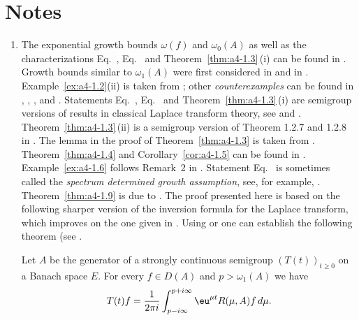 \section*{Notes}
\begin{enumerate}[label=\emph{Section \arabic*:}, wide, itemsep=1ex]

\item 
The exponential growth bounds $\omega(f)$ and $\omega_{0}(A)$ as well as the characterizations Eq.~, Eq.~ and Theorem~\ref{thm:a4-1.3}\,(i) can be found in \textcite{hillephillips:1957}.
Growth bounds similar to $\omega_{1}(A)$ were first considered in \textcite{djacenko:1976} and in \textcite[Proposition~2]{zabczyk:1979}. 
Example~\ref{ex:a4-1.2}(ii) is taken from \textcite{wolff:1981}; other \emph{counterexamples} can be found in \textcite{hillephillips:1957}, \textcite{foias:1973}, \textcite{triggiani:1975a}, 
\textcite{zabczyk:1975} and \textcite{greinervoigtwolff:1981}. 
Statements Eq.~, Eq.~ and Theorem~\ref{thm:a4-1.3}\,(i) are semigroup versions of results in classical Laplace transform theory, see \textcite{hillephillips:1957} and \textcite{widder:1946}. 
Theorem~\ref{thm:a4-1.3}\,(ii) is a semigroup version of Theorem 1.2.7 and 1.2.8 in \textcite{doetsch:1950}. 
The lemma in the proof of Theorem~\ref{thm:a4-1.3} is taken from \textcite{milstein:1975}. 
Theorem~\ref{thm:a4-1.4} and Corollary~\ref{cor:a4-1.5} can be found in \textcite{neubrander:1985a}. 
Example~\ref{ex:a4-1.6} follows Remark~2 in \textcite{zabczyk:1975}. 
Statement Eq.~ is sometimes called the \emph{spectrum determined growth assumption}, see, for example, \textcite{triggiani:1975b}. 
Theorem~\ref{thm:a4-1.9} is due to \textcite{slemrod:1976}. 
The proof presented here is based on the following sharper version of the inversion formula for the Laplace transform, which improves on the one given in \textcite[p.349]{hillephillips:1957}. 
Using \textcite[p.66]{widder:1946} or \textcite[p.212]{doetsch:1950} one can establish the following theorem (see \textcite{neubrander:1984b}.
\begin{theorem}\label{thm:a4-2.6}
Let $A$ be the generator of a strongly continuous semigroup $(T(t))_{t \geq 0}$ on a Banach space $E$. 
For every $f \in D(A)$ and $p > \omega_{1}(A)$ we have
\[
T(t)f = \frac{1}{2\pi i} \int_{p-i\infty}^{p+i\infty} \eu^{\mu t}R(\mu,A)f \, d\mu.
\]
\end{theorem}
 


\end{enumerate}
